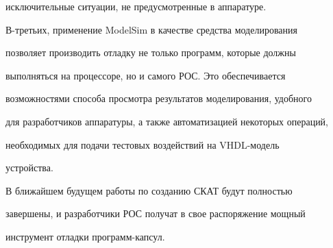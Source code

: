 исключительные ситуации, не предусмотренные в аппаратуре.


      


      В-третьих, применение ModelSim в качестве средства моделирования 


позволяет производить отладку не только программ, которые должны 


выполняться на процессоре, но и самого РОС. Это обеспечивается 


возможностями способа просмотра результатов моделирования, удобного 


для разработчиков аппаратуры, а также автоматизацией некоторых операций, 


необходимых для подачи тестовых воздействий на VHDL-мо\-дель 


устройства.


      


      В ближайшем будущем работы по созданию СКАТ будут полностью 


завершены, и разработчики РОС получат в свое распоряжение мощный 


инструмент отладки про\-грамм-кап\-сул.





